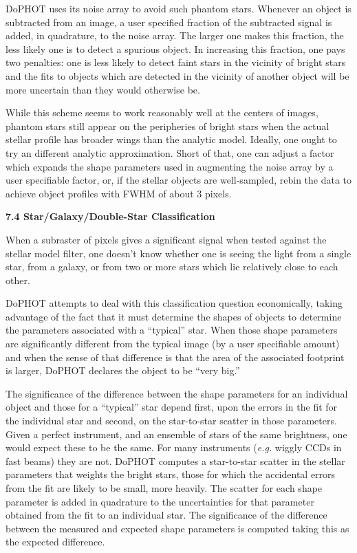 DoPHOT uses its noise array to avoid such phantom stars.
Whenever an object is subtracted from an image, a user
specified fraction of the subtracted signal is added, in
quadrature, to the noise array.  The larger one makes this
fraction, the less likely one is to detect a spurious
object.  In increasing this fraction, one pays two
penalties: one is less likely to detect faint stars in the
vicinity of bright stars and the fits to objects which are
detected in the vicinity of another object will be more
uncertain than they would otherwise be.

While this scheme seems to work reasonably well at the
centers of images, phantom stars still appear on the
peripheries of bright stars when the actual stellar profile
has broader wings than the analytic model.  Ideally, one
ought to try an different analytic approximation.  Short of
that, one can adjust a factor which expands the shape
parameters used in augmenting the noise array by a user
specifiable factor, or, if the stellar objects are well-sampled, rebin
the data to achieve object profiles with FWHM of about 3 pixels.

\centerline{\bf 7.4 Star/Galaxy/Double-Star Classification}

When a subraster of pixels gives a significant signal when
tested against the stellar model filter, one doesn't know
whether one is seeing the light from a single star, from a
galaxy, or from two or more stars which lie relatively close
to each other.  

DoPHOT attempts to deal with this classification question
economically, taking advantage of the fact that it must
determine the shapes of objects to determine the parameters
associated with a ``typical'' star.  When those shape parameters
are significantly different from the typical image (by a
user specifiable amount) and when the sense of that
difference is that the area of the associated footprint is
larger, DoPHOT declares the object to be ``very big.''

The significance of the difference between the shape
parameters for an individual object and those for a
``typical'' star depend first, upon the errors in the fit
for the individual star and second, on the star-to-star
scatter in those parameters.  Given a perfect instrument,
and an ensemble of stars of the same brightness, one would
expect these to be the same.  For many instruments ({\it e.g.}
wiggly CCDs in fast beams) they are not.  DoPHOT computes a
star-to-star scatter in the stellar parameters that weights
the bright stars, those for which the accidental errors from
the fit are likely to be small, more heavily.  The scatter
for each shape parameter is added in quadrature to the
uncertainties for that parameter obtained from the fit to an
individual star.  The significance of the difference between
the measured and expected shape parameters is computed
taking this as the expected difference.


